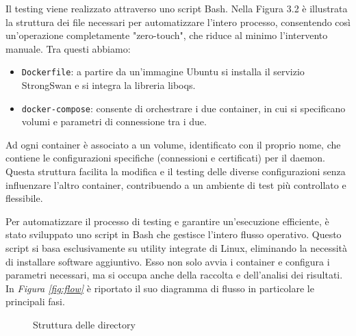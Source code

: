 \noindent
Il testing viene realizzato attraverso uno script Bash. Nella Figura 3.2 è
illustrata la struttura dei file necessari per automatizzare l'intero processo,
consentendo così un'operazione completamente "zero-touch", che riduce al
minimo l'intervento manuale.
Tra questi abbiamo:


\begin{itemize}
    \item \texttt{Dockerfile}: a partire da un'immagine Ubuntu si installa il servizio StrongSwan e si integra la libreria liboqs.
    \item \texttt{docker-compose}: consente di orchestrare i due container, in cui si specifi\-cano volumi e parametri di connessione tra i due.
\end{itemize}
\noindent
Ad ogni container è associato a un volume, identificato con il proprio
nome, che contiene le configurazioni specifiche (connessioni e certificati) per il daemon.
Questa struttura facilita la modifica e il testing delle diverse configu\-razioni
senza influenzare l'altro container, contribuendo a un ambiente di test più
controllato e flessibile.

\noindent
Per automatizzare il processo di testing e garantire un'esecuzione efficiente, è
stato sviluppato uno script in Bash che gestisce l'intero flusso operativo.
Questo script si basa esclusivamente su utility integrate di Linux, eliminando
la necessità di installare software aggiuntivo. Esso non solo avvia i container
e configura i parametri necessari, ma si occupa anche della raccolta e
dell'analisi dei risultati. In \textit{Figura \ref{fig:flow}} è riportato il suo diagramma di flusso
in particolare le principali fasi.


\begin{figure}
    \caption{Struttura delle directory}
    \label{fig:tree}
\end{figure}


